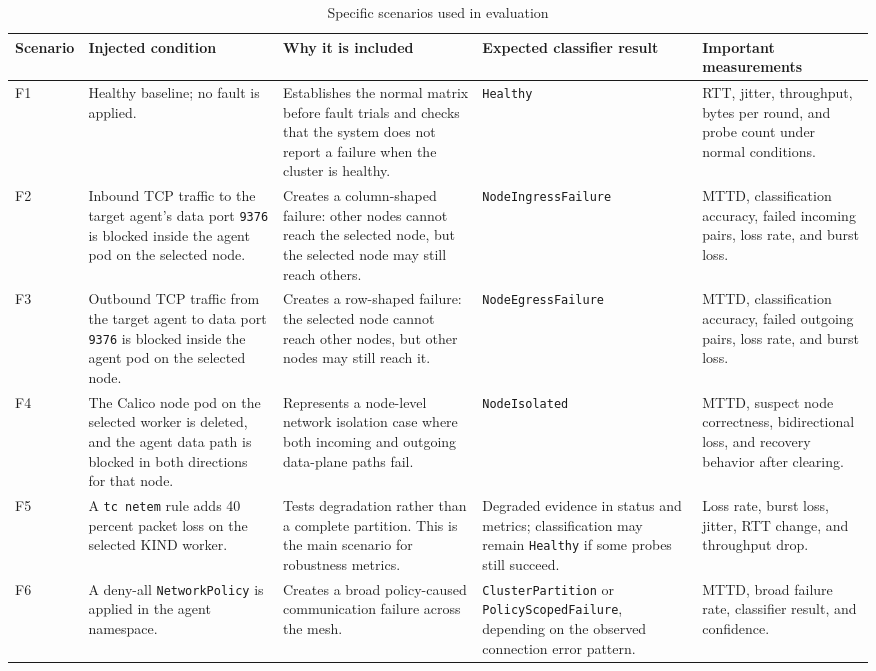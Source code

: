 \documentclass[11pt,a4paper]{article}
\newcommand{\code}[1]{\texttt{#1}}
\begin{document}
\begin{table}[h]
\centering
\caption{Specific scenarios used in evaluation}
\label{tab:p5-scenarios}
\scriptsize
\begin{tabularx}{\textwidth}{@{}lYYYY@{}}
\toprule
\textbf{Scenario} & \textbf{Injected condition} & \textbf{Why it is included} & \textbf{Expected classifier result} & \textbf{Important measurements} \\
\midrule
F1 & Healthy baseline; no fault is applied. & Establishes the normal matrix before fault trials and checks that the system does not report a failure when the cluster is healthy. & \code{Healthy} & RTT, jitter, throughput, bytes per round, and probe count under normal conditions. \\
F2 & Inbound TCP traffic to the target agent's data port \code{9376} is blocked inside the agent pod on the selected node. & Creates a column-shaped failure: other nodes cannot reach the selected node, but the selected node may still reach others. & \code{NodeIngressFailure} & MTTD, classification accuracy, failed incoming pairs, loss rate, and burst loss. \\
F3 & Outbound TCP traffic from the target agent to data port \code{9376} is blocked inside the agent pod on the selected node. & Creates a row-shaped failure: the selected node cannot reach other nodes, but other nodes may still reach it. & \code{NodeEgressFailure} & MTTD, classification accuracy, failed outgoing pairs, loss rate, and burst loss. \\
F4 & The Calico node pod on the selected worker is deleted, and the agent data path is blocked in both directions for that node. & Represents a node-level network isolation case where both incoming and outgoing data-plane paths fail. & \code{NodeIsolated} & MTTD, suspect node correctness, bidirectional loss, and recovery behavior after clearing. \\
F5 & A \code{tc netem} rule adds 40 percent packet loss on the selected KIND worker. & Tests degradation rather than a complete partition. This is the main scenario for robustness metrics. & Degraded evidence in status and metrics; classification may remain \code{Healthy} if some probes still succeed. & Loss rate, burst loss, jitter, RTT change, and throughput drop. \\
F6 & A deny-all \code{NetworkPolicy} is applied in the agent namespace. & Creates a broad policy-caused communication failure across the mesh. & \code{ClusterPartition} or \code{PolicyScopedFailure}, depending on the observed connection error pattern. & MTTD, broad failure rate, classifier result, and confidence. \\
\bottomrule
\end{tabularx}
\end{table}
\end{document}
